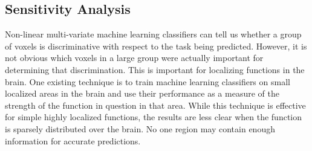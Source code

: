 \documentclass[final]{article}
\begin{document}
\subsection{Sensitivity Analysis}
Non-linear multi-variate machine learning classifiers can tell us whether a group of voxels is discriminative with respect to the task being predicted.
However, it is not obvious which voxels in a large group were actually important for determining that discrimination.
This is important for localizing functions in the brain.
One existing technique is to train machine learning classifiers on small localized areas in the brain and use their performance as a measure of the strength of the function in question in that area.
While this technique is effective for simple highly localized functions, the results are less clear when the function is sparsely distributed over the brain.
No one region may contain enough information for accurate predictions.
\end{document}
